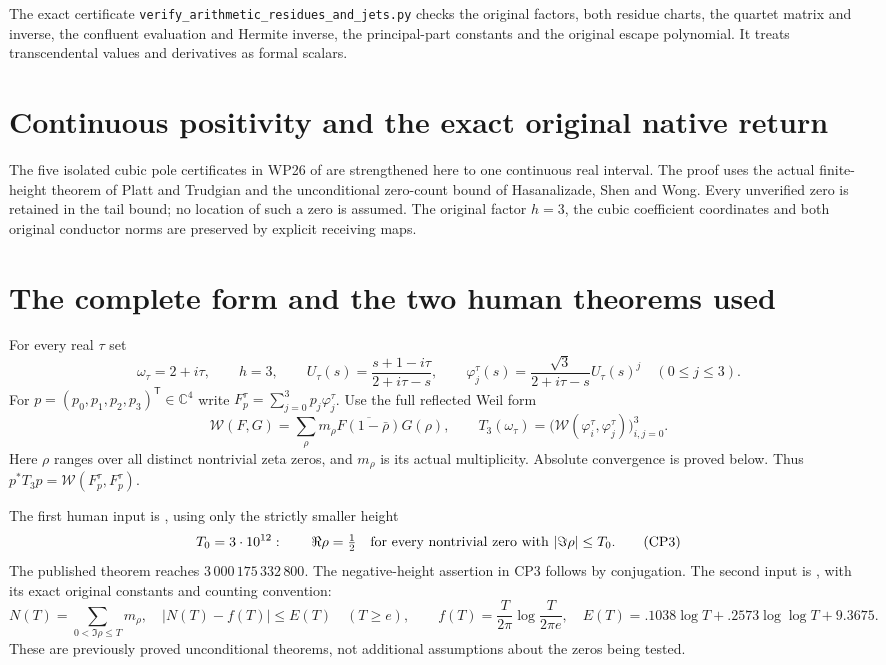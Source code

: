 \documentclass[11pt]{article}
\providecommand{\W}{\mathcal W}
\newcommand{\C}{\mathbb C}
\begin{document}
The exact certificate
\texttt{verify\_arithmetic\_residues\_and\_jets.py}
checks the original factors, both residue charts, the quartet
matrix and inverse, the confluent evaluation and Hermite inverse,
the principal-part constants and the original escape polynomial.
It treats transcendental values and derivatives as formal scalars.

\clearpage

\section{Continuous positivity and the exact original native return}
The five isolated cubic pole certificates in WP26 of \cite{WeilCertificates}
are strengthened here to one continuous real interval. The
proof uses the actual finite-height theorem of Platt and Trudgian
and the unconditional zero-count bound of Hasanalizade, Shen
and Wong. Every unverified zero is retained in the tail bound;
no location of such a zero is assumed. The original factor
$h=3$, the cubic coefficient coordinates and both original
conductor norms are preserved by explicit receiving maps.

\section{The complete form and the two human theorems used}
For every real $\tau$ set
\begin{equation}
\omega_\tau=2+i\tau,\qquad h=3,\qquad
U_\tau(s)=\frac{s+1-i\tau}{2+i\tau-s},\qquad
\varphi_j^\tau(s)=\frac{\sqrt3}{2+i\tau-s}U_\tau(s)^j
\quad(0\le j\le3).
\tag{CP1}
\end{equation}
For $p=(p_0,p_1,p_2,p_3)^{\mathsf T}\in\C^4$ write
$F_p^\tau=\sum_{j=0}^3p_j\varphi_j^\tau$.
Use the full reflected Weil form
\begin{equation}
\W(F,G)=\sum_\rho m_\rho
       \overline{F(1-\bar\rho)}G(\rho),\qquad
T_3(\omega_\tau)=\bigl(\W(\varphi_i^\tau,\varphi_j^\tau)\bigr)_{i,j=0}^3 .
\tag{CP2}
\end{equation}
Here $\rho$ ranges over all distinct nontrivial zeta zeros,
and $m_\rho$ is its actual multiplicity. Absolute convergence
is proved below. Thus $p^*T_3p=\W(F_p^\tau,F_p^\tau)$.

The first human input is \cite[Theorem 1]{PlattTrudgian}, using only
the strictly smaller height
\begin{equation}
T_0=3\cdot10^{12}:
\qquad \Re\rho=\tfrac12
\quad\hbox{for every nontrivial zero with }|\Im\rho|\le T_0.
\tag{CP3}
\end{equation}
The published theorem reaches $3\,000\,175\,332\,800$.
The negative-height assertion in CP3 follows by conjugation.
The second input is \cite[Corollary 1.2]{HSW}, with its exact
original constants and counting convention:
\begin{equation}
N(T)=\sum_{0<\Im\rho\le T}m_\rho,\quad
|N(T)-f(T)|\le E(T)\quad(T\ge e),\qquad
f(T)=\frac{T}{2\pi}\log\frac{T}{2\pi e},\quad
E(T)=.1038\log T+.2573\log\log T+9.3675.
\tag{CP4}
\end{equation}
These are previously proved unconditional theorems, not
additional assumptions about the zeros being tested.
\end{document}
